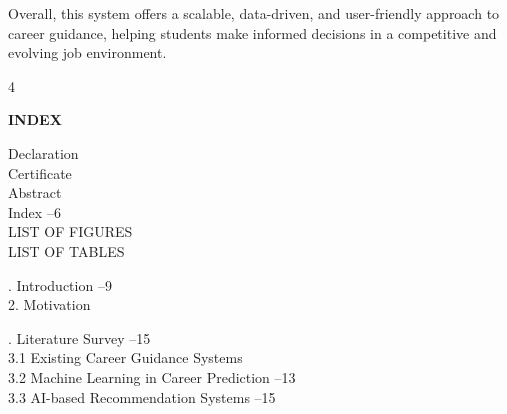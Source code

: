 \documentclass[12pt,a4paper]{report}
\begin{document}
\vspace{0.3cm}
\noindent
Overall, this system offers a scalable, data-driven, and user-friendly approach to career guidance, helping students make informed decisions in a competitive and evolving job environment.

\noindent

\begin{center}\vspace{8cm}
4
\end{center}

\newpage


\clearpage
\thispagestyle{empty}

\begin{center}
    {\Large \textbf{INDEX}}\\[0.3cm]
\end{center}

\vspace{0.8cm}

\noindent
Declaration \\
Certificate \\
Abstract \\
Index --6\\
LIST OF FIGURES \\
LIST OF TABLES \\

\vspace{0.5cm}

. Introduction --9\\
2. Motivation \\

\vspace{0.5cm}

. Literature Survey --15\\
\hspace{0.5cm}3.1 Existing Career Guidance Systems \\
\hspace{0.5cm}3.2 Machine Learning in Career Prediction --13\\
\hspace{0.5cm}3.3 AI-based Recommendation Systems --15\\

\vspace{0.5cm}
\end{document}
